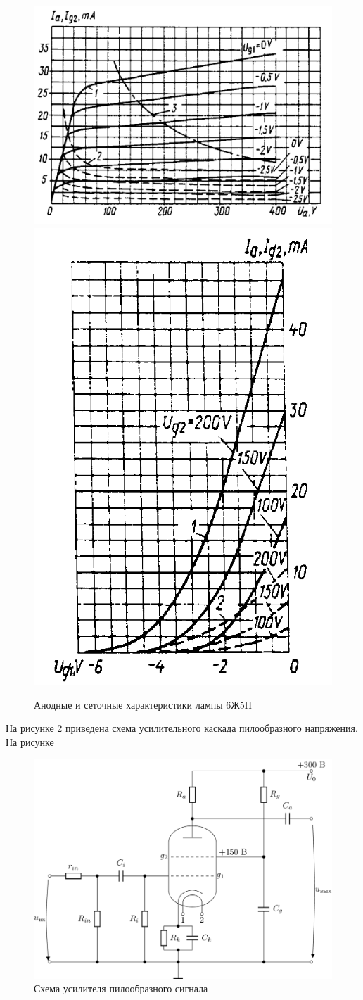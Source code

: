 \documentclass[a4paper,14pt]{extarticle}
\begin{document}
    \begin{figure}[!h]
    	\begin{center}
    		\includegraphics[width=.6\textwidth]{images/6Z5P1.png}
    		\includegraphics[width=.3\textwidth]{images/6Z5P2.png}
    	\end{center}
    	\caption{Анодные и сеточные характеристики лампы 6Ж5П}
    	\label{fig6z5p}
    \end{figure}
    
    На рисунке \ref{figcasc} приведена схема усилительного каскада пилообразного напряжения. На рисунке 
    
    \begin{figure}[!h]
        \begin{center}
            \includegraphics[width=.4\textwidth]{images/amplifier.png}
        \end{center}
        \caption{Схема усилителя пилообразного сигнала}
        \label{figcasc}
    \end{figure}
    
\end{document}
